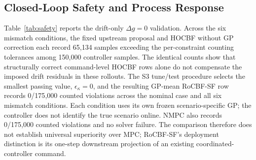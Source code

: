 \subsection{Closed-Loop Safety and Process Response}

\begin{table}[htbp]
    \centering
    \caption{Primary $\Delta g=0$ validation: sample-level constraint violation rate (\%) at controller instants, computed by Eq.~\eqref{eq:sample_violation_rate} with per-constraint native-unit tolerances of numerical value $10^{-2}$. Each cell aggregates 50 independent 500-sample rollouts (25{,}000 controller samples). The fixed-proposal, HOCBF, and RoCBF-SF rows share the same upstream command; NMPC uses its own receding-horizon proposal. The $\epsilon_\kappa=1$ row is an implemented endpoint test, not the recommended commissioned setting.}
    \label{tab:safety}
    \small
\end{table}

Table~\ref{tab:safety} reports the drift-only $\Delta g=0$ validation. Across the six mismatch conditions, the fixed upstream proposal and HOCBF without GP correction each record 65{,}134 samples exceeding the per-constraint counting tolerances among 150{,}000 controller samples. The identical counts show that structurally correct command-level HOCBF rows alone do not compensate the imposed drift residuals in these rollouts. The S3 tune/test procedure selects the smallest passing value, $\epsilon_\kappa=0$, and the resulting GP-mean RoCBF-SF row records 0/175{,}000 counted violations across the nominal case and all six mismatch conditions. Each condition uses its own frozen scenario-specific GP; the controller does not identify the true scenario online. NMPC also records 0/175{,}000 counted violations and no solver failure. The comparison therefore does not establish universal superiority over MPC; RoCBF-SF's deployment distinction is its one-step downstream projection of an existing coordinated-controller command.

